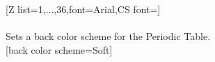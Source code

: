 \newpage
{}[Z list={1,...,36},font=Arial,CS font=\string{}\string\selectfont]%
\\ [10pt]%
\\ [5pt]\pgfPTendoption%
\label{option_back color scheme}%
\vfill
{}%
{Sets a  back color scheme for the Periodic Table.}%
\\ [5pt][back color scheme=Soft]%
\\ [5pt]\makebox[\linewidth][c]{\scalebox{.6}{\pgfPT[back color scheme=Soft]}}%
\newpage%
